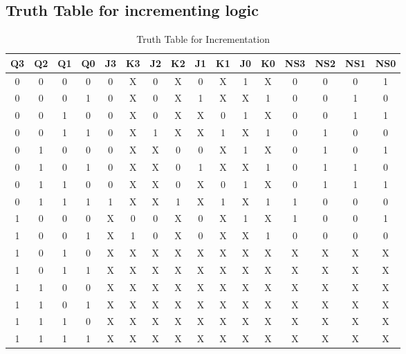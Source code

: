 \documentclass[a4paper,12pt]{article}
\begin{document}
\subsection{Truth Table for incrementing logic}
\begin{table}[H]
    \centering
    \renewcommand{\arraystretch}{1.3}
    \begin{tabular}{|c|c|c|c|c|c|c|c|c|c|c|c|c|c|c|c|}
        \hline
        \textbf{Q3} & \textbf{Q2} & \textbf{Q1} & \textbf{Q0} & \textbf{J3} & \textbf{K3} & \textbf{J2} & \textbf{K2} & \textbf{J1} & \textbf{K1} & \textbf{J0} & \textbf{K0} & \textbf{NS3} & \textbf{NS2} & \textbf{NS1} & \textbf{NS0} \\
        \hline
       0 & 0 & 0 & 0 &0 &X &0 & X& 0& X& 1& X& 0 & 0 & 0 & 1 \\
        0 & 0 & 0 & 1 &0 &X &0 &X &1 &X &X & 1& 0 & 0 & 1 & 0 \\
        0 & 0 & 1 & 0 & 0& X& 0& X& X& 0& 1& X&  0 & 0 & 1 & 1 \\
        0 & 0 & 1 & 1 &0 &X &1 &X &X &1 &X &1 & 0 & 1 & 0 & 0 \\
        0 & 1 & 0 & 0 &0 &X &X &0 &0 &X &1 &X & 0 & 1 & 0 & 1 \\
        0 & 1 & 0 & 1 & 0&X &X &0 &1 &X &X &1 &  0 & 1 & 1 & 0 \\
        0 & 1 & 1 & 0 & 0& X& X& 0& X& 0& 1& X&  0 & 1 & 1 & 1 \\
        0 & 1 & 1 & 1 & 1& X&X &1 &X &1 &X &1 & 1 & 0 & 0 & 0 \\
        1 & 0 & 0 & 0 &X &0 &0 &X &0 &X &1 &X & 1 & 0 & 0 & 1 \\
        1 & 0 & 0 & 1 &X & 1&0 &X & 0&X &X &1& 0 & 0 & 0 & 0 \\
        \hline
        1 & 0 & 1 & 0 & X& X& X&X &X & X&X &X & X & X & X & X \\
        1 & 0 & 1 & 1 & X& X&X & X&X & X&X & X& X & X & X & X \\
        1 & 1 & 0 & 0 & X& X&X &X &X &X &X &X & X & X & X & X \\
        1 & 1 & 0 & 1 & X& X& X& X& X& X& X& X& X & X & X & X \\
        1 & 1 & 1 & 0 & X&X &X & X& X& X& X& X& X & X & X & X \\
        1 & 1 & 1 & 1 & X& X& X& X& X& X& X& X& X & X & X & X \\
        \hline
    \end{tabular}
    \caption{Truth Table for Incrementation}
    \label{tab:truth_table}
\end{table}
\end{document}
